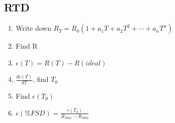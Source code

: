 \documentclass{article}
\begin{document}
  
  \subsection{RTD}
  \begin{enumerate}
    \item Write down $R_T = R_0(1+a_1T + a_2T^2 + \cdots + a_nT^n)$
    \item Find R
    \item $\epsilon(T) = R(T) - R(ideal)$
    \item $\frac{d\epsilon (T)}{dT}$, find $T_0$
    \item Find $\epsilon (T_0)$
    \item $\epsilon(\% FSD) = \frac{\epsilon (T_0)}{R_{Max} - R_{Min}}$
  \end{enumerate}
\end{document}
